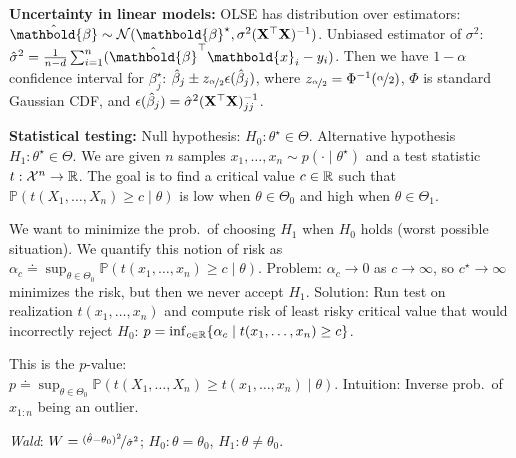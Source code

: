 \documentclass[9pt]{extarticle}
\newenvironment{topic}[1]
{\textbf{\sffamily \colorbox{black}{\rlap{\textbf{\textcolor{white}{#1}}}\hspace{\linewidth}\hspace{-2\fboxsep}}}}
{}
\newenvironment{subtopic}[1]
{\textbf{\sffamily #1:}}
{}
\renewcommand{\mat}[1]{\ensuremath{\mathbf{#1}}}
\renewcommand{\vec}[1]{\ensuremath{\mathbold{#1}}}
\begin{document}
\begin{multicols*}{3}
\begin{topic}{Uncertainty quantification}
        \begin{subtopic}{Uncertainty in linear models}
            OLSE has distribution over estimators: $\hat{\vec{\beta}} \sim \mathcal{N}(\vec{\beta}^\star, \sigma^2 \inv{(\transpose{\mat{X}} \mat{X})})$.
            Unbiased estimator of $\sigma^2$: $\hat{\sigma}^2 = \frac{1}{n-d} \sum_{i=1}^{n}
                (\transpose{\hat{\vec{\beta}}} \vec{x}_i - y_i)$. Then we have $1-\alpha$ confidence interval for
            $\beta_j^\star$: $\hat{\beta}_j \pm z_{\nicefrac{\alpha}{2}} \epsilon(\hat{\beta}_j)$,
            where $z_{\nicefrac{\alpha}{2}} = \Phi^{-1}(\nicefrac{\alpha}{2})$, $\Phi$ is standard Gaussian
            CDF, and $\epsilon(\hat{\beta}_j) = \hat{\sigma}^2 \inv{(\transpose{\mat{X}} \mat{X})}_{jj}$.

        \end{subtopic}

        \begin{subtopic}{Statistical testing}
            Null hypothesis: $H_0: \theta^\star \in \Theta$. Alternative hypothesis $H_1: \theta^\star \in
                \Theta$. We are given $n$ samples $x_1, \ldots, x_n \sim p(\cdot \mid \theta^\star)$ and a test
            statistic $t: \mathcal{X}^n \to \mathbb{R}$. The goal is to find a critical value $c \in \mathbb{R}$ such that
            $\mathbb{P}(t(X_1,\ldots,X_n) \geq c \mid \theta)$ is low when $\theta \in \Theta_0$ and high when
            $\theta \in \Theta_1$.

            We want to minimize the prob.\ of choosing $H_1$ when $H_0$ holds (worst possible situation). We
            quantify this notion of risk as $\alpha_c \doteq \sup_{\theta \in \Theta_0} \mathbb{P}(t(x_1,
                \ldots, x_n) \geq c \mid \theta)$. Problem: $\alpha_c \to 0$ as $c \to \infty$, so $c^\star \to
                \infty$ minimizes the risk, but then we never accept $H_1$. Solution: Run test on realization
            $t(x_1, \ldots, x_n)$ and compute risk of least risky critical value that would incorrectly reject
            $H_0$: $p = \inf_{c \in \mathbb{R}} \{ \alpha_c \mid t(x_1, \ldots, x_n) \geq c \}$.

            This is the $p$-value: \\ $p \doteq \sup_{\theta \in \Theta_0} \mathbb{P}(t(X_1, \ldots, X_n) \geq
                t(x_1, \ldots, x_n) \mid \theta)$. Intuition: Inverse prob.\ of $x_{1:n}$ being an outlier.

            \textit{Wald}: $W = \nicefrac{(\hat{\theta} - \theta_0)^2}{\hat{\sigma}^2}$;
            $H_0: \theta = \theta_0$, $H_1: \theta \neq \theta_0$.
        \end{subtopic}


\end{topic}
\end{multicols*}
\end{document}
